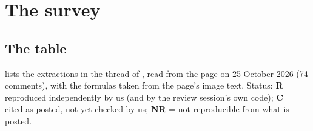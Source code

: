 \documentclass[11pt]{article}
\theoremstyle{definition}
\begin{document}
\section{The survey}\label{sec:survey}

\subsection{The table}
 lists the extractions in the thread of \cite{Tao2026}, read from the page on 25 October 2026 (74 comments), with the formulas taken from the page's image text. Status: \textbf{R} = reproduced independently by us (and by the review session's own code); \textbf{C} = cited as posted, not yet checked by us; \textbf{NR} = not reproducible from what is posted.
\end{document}
